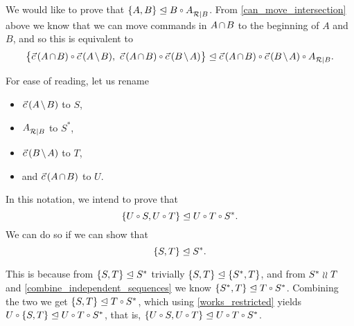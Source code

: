 We would like to prove that $\worksmbx{A,B}{B\cc \reca}$.
From \cref{can_move_intersection} above we know that we can move commands in $\acbnp$
to the beginning of $A$ and $B$, and so this is equivalent to
\[ \worksm{\big\{\acb\cc\amb,~ \acb\cc\bma\big\}}{\acb\cc \bma\cc \reca}. \]

For ease of reading, let us rename
\begin{itemize}
\item $\amb$ to $S$,
\item ${A}^{}_{\mathcal{R}|{B}}$ to $S^*$,
\item $\bma$ to $T$,
\item and $\acb$ to $U$.
\end{itemize}
In this notation, we intend to prove that
\[ \worksmbx{U\cc S,U\cc T}{U\cc T\cc S^*}. \]
We can do so if we can show that
\[ {\{{S,T}\}}\trianglelefteq{S^*}. \]

This is because from ${\{{S,T}\}}\trianglelefteq{S^*}$ trivially ${\{{S,T}\}}\trianglelefteq{\{{S^*, T}\}}$,
and from $S^* \mathrel{\wr\wr} T$ and \cref{combine_independent_sequences} we know 
$\worksmbx{S^*,T}{T\cc S^*}$.
Combining the two we get $\worksmbx{S,T}{T\cc S^*}$,
which using \cref{works_restricted} yields
$\worksm{U\cc\{S,T\}}{U\cc T\cc S^*}$, that is,
$\worksmbx{U\cc S,U\cc T}{U\cc T\cc S^*}$.

